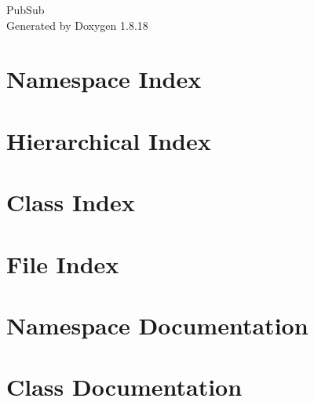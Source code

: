 \let\mypdfximage\pdfximage\def\pdfximage{\immediate\mypdfximage}\documentclass[twoside]{book}
\newcommand{\+}{\discretionary{\mbox{\scriptsize$\hookleftarrow$}}{}{}}
\newcommand{\clearemptydoublepage}{%
  \newpage{\pagestyle{empty}\cleardoublepage}%
}
\begin{document}
\hypersetup{pageanchor=false,
             bookmarksnumbered=true,
             pdfencoding=unicode
            }
\begin{titlepage}
\vspace*{7cm}
\begin{center}%
{\Large Pub\+Sub }\\
\vspace*{1cm}
{\large Generated by Doxygen 1.8.18}\\
\end{center}
\end{titlepage}
\clearemptydoublepage
{}
\tableofcontents
\clearemptydoublepage
{}
\hypersetup{pageanchor=true}

\chapter{Namespace Index}

\chapter{Hierarchical Index}

\chapter{Class Index}

\chapter{File Index}

\chapter{Namespace Documentation}



\chapter{Class Documentation}

















\end{document}
